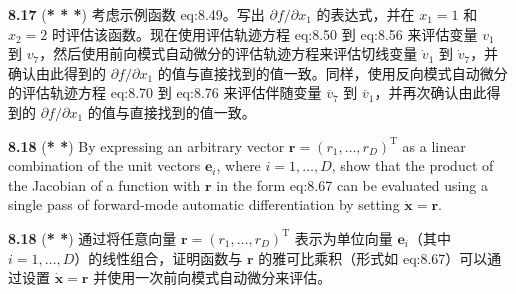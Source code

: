 \documentclass{article}
\begin{document}
\textbf{8.17} (\textbf{* * *}) 考虑示例函数 {eq:8.49}。写出 $\partial f / \partial x_1$ 的表达式，并在 $x_1 = 1$ 和 $x_2 = 2$ 时评估该函数。现在使用评估轨迹方程 {eq:8.50} 到 {eq:8.56} 来评估变量 $v_1$ 到 $v_7$，然后使用前向模式自动微分的评估轨迹方程来评估切线变量 $\dot{v}_1$ 到 $\dot{v}_7$，并确认由此得到的 $\partial f / \partial x_1$ 的值与直接找到的值一致。同样，使用反向模式自动微分的评估轨迹方程 {eq:8.70} 到 {eq:8.76} 来评估伴随变量 $\overline{v}_7$ 到 $\overline{v}_1$，并再次确认由此得到的 $\partial f / \partial x_1$ 的值与直接找到的值一致。

\textbf{8.18} (\textbf{* *}) By expressing an arbitrary vector $\mathbf{r} = (r_1, \ldots, r_D)^\mathrm{T}$ as a linear combination of the unit vectors $\mathbf{e}_i$, where $i = 1, \ldots, D$, show that the product of the Jacobian of a function with $\mathbf{r}$ in the form {eq:8.67} can be evaluated using a single pass of forward-mode automatic differentiation by setting $\dot{\mathbf{x}} = \mathbf{r}$.

\textbf{8.18} (\textbf{* *}) 通过将任意向量 $\mathbf{r} = (r_1, \ldots, r_D)^\mathrm{T}$ 表示为单位向量 $\mathbf{e}_i$（其中 $i = 1, \ldots, D$）的线性组合，证明函数与 $\mathbf{r}$ 的雅可比乘积（形式如 {eq:8.67}）可以通过设置 $\dot{\mathbf{x}} = \mathbf{r}$ 并使用一次前向模式自动微分来评估。
\end{document}
